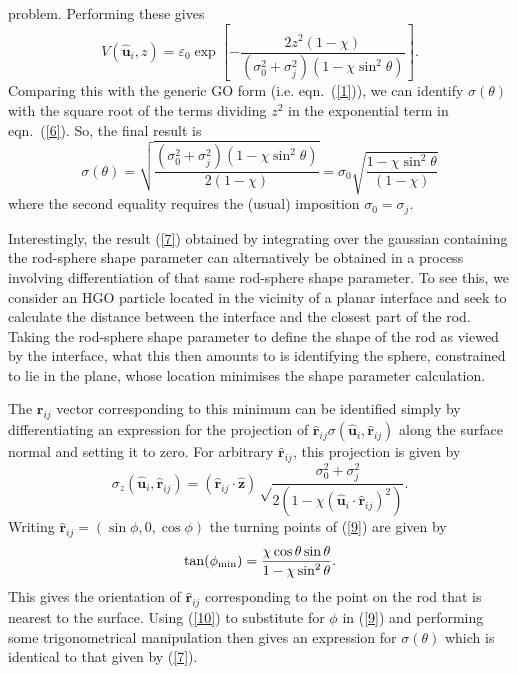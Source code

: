 \documentclass[aps,10pt,twocolumn]{revtex4}
\newcommand{\vect}[1]{ \mathbf{#1} }
\newcommand{\vecth}[1]{ \mathbf{\hat{#1} } }
\newcommand{\rij}{\vecth{r}_{ij}}
\newcommand{\ui}{\vecth{u}_i}
\begin{document}
problem. Performing these gives
\begin{equation}
\label{6}
 V(\ui,z)= \varepsilon_0  \exp
 \left[ - \frac{2z^2(1-\chi)} {(\sigma_{0}^2+\sigma_{j}^2)(1-\chi\sin^2\theta)} \right] .
\end{equation}
Comparing this with the generic GO form (i.e. eqn.~(\ref{1})), we can identify $\sigma(\theta)$  with the square
root of the terms dividing $z^2$ in the exponential term in eqn.~(\ref{6}). So, the final result is
\begin{equation}
\label{7} \sigma(\theta)=\sqrt{\frac{(\sigma_{0}^2+\sigma_{j}^2)(1-\chi\sin^2\theta)}{2(1-\chi)}} =
\sigma_0\sqrt{\frac{1-\chi\sin^2\theta}{(1-\chi)}}
\end{equation}
where the second equality requires the (usual) imposition $\sigma_{0}=\sigma_{j}$.

Interestingly, the result (\ref{7}) obtained by integrating over the gaussian containing the rod-sphere shape
parameter can alternatively be obtained in a process involving differentiation of that same rod-sphere shape
parameter. To see this, we consider an HGO particle located in the vicinity of a planar interface and seek to
calculate the distance between the interface and the closest part of the rod. Taking the rod-sphere shape
parameter to define the shape of the rod as viewed by the interface, what this then amounts to is identifying the
sphere, constrained to lie in the plane, whose location minimises the shape parameter calculation.

The $\vect{r}_{ij}$ vector corresponding to this minimum can be identified simply by differentiating an expression
for the projection of $\rij\sigma(\ui,\rij)$ along the surface normal and setting it to zero. For arbitrary
$\rij$, this projection is given by
\begin{equation}
\label{9} \sigma_z(\ui,\rij)= (\rij\cdot\vecth{z})\sqrt  \frac{\sigma_{0}^2+\sigma_{j}^2} {2(1-\chi(\ui \cdot
\rij)^2)}.
\end{equation}
Writing $\rij=(\sin\phi,0,\cos\phi)$ the turning points of (\ref{9}) are given by
\begin{equation}
\label{10} \tan(\phi_{\rm min})= \frac{\chi\cos\theta\sin\theta} {1-\chi\sin^2\theta}.
\end{equation}
This gives the orientation of $\rij$ corresponding to the point on the rod that is nearest to the surface. Using
(\ref{10}) to substitute for $\phi$ in (\ref{9}) and performing some trigonometrical manipulation then gives an
expression for $\sigma(\theta)$ which is identical to that given by (\ref{7}).
\end{document}
